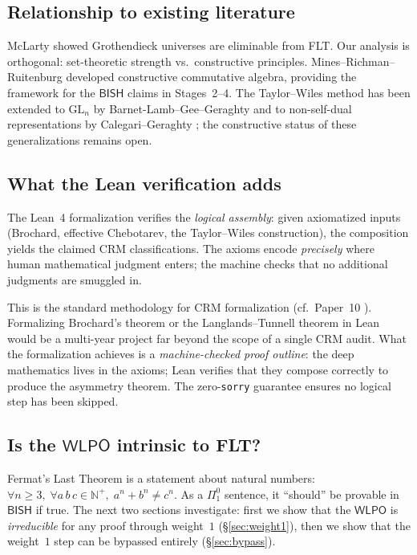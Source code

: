 \documentclass[11pt]{article}
\theoremstyle{plain}
\theoremstyle{definition}
\theoremstyle{remark}
\newcommand{\N}{\mathbb{N}}
\newcommand{\GL}{\mathrm{GL}}
\newcommand{\BISH}{\mathsf{BISH}}
\newcommand{\WLPO}{\mathsf{WLPO}}
\begin{document}
\subsection{Relationship to existing literature}

McLarty \cite{McLarty2010} showed Grothendieck universes are
eliminable from FLT.  Our analysis is orthogonal: set-theoretic
strength vs.\ constructive principles.  Mines--Richman--Ruitenburg
\cite{MRR1988} developed constructive commutative algebra, providing
the framework for the $\BISH$ claims in Stages~2--4.  The
Taylor--Wiles method has been extended to $\GL_n$ by
Barnet-Lamb--Gee--Geraghty \cite{BLGGT2014} and to non-self-dual
representations by Calegari--Geraghty \cite{CalegariGeraghty2018};
the constructive status of these generalizations remains open.

\subsection{What the Lean verification adds}

The Lean~4 formalization verifies the \emph{logical assembly}: given
axiomatized inputs (Brochard, effective Chebotarev, the Taylor--Wiles
construction), the composition yields the claimed CRM classifications.
The axioms encode \emph{precisely} where human mathematical judgment
enters; the machine checks that no additional judgments are smuggled in.

This is the standard methodology for CRM formalization (cf.\
Paper~10 \cite{Paper10}).  Formalizing Brochard's theorem or the
Langlands--Tunnell theorem in Lean would be a multi-year project far
beyond the scope of a single CRM audit.  What the formalization
achieves is a \emph{machine-checked proof outline}: the deep mathematics
lives in the axioms; Lean verifies that they compose correctly to
produce the asymmetry theorem.  The zero-\texttt{sorry} guarantee
ensures no logical step has been skipped.

\subsection{Is the \texorpdfstring{$\WLPO$}{WLPO} intrinsic to FLT?}

Fermat's Last Theorem is a statement about natural numbers:
$\forall n \ge 3,\; \forall a\,b\,c \in \N^+,\;
a^n + b^n \neq c^n$.  As a $\Pi^0_1$ sentence, it ``should'' be
provable in~$\BISH$ if true.  The next two sections investigate:
first we show that the $\WLPO$ is \emph{irreducible} for any
proof through weight~$1$ (\S\ref{sec:weight1}), then we show
that the weight~$1$ step can be bypassed entirely
(\S\ref{sec:bypass}).
\end{document}
